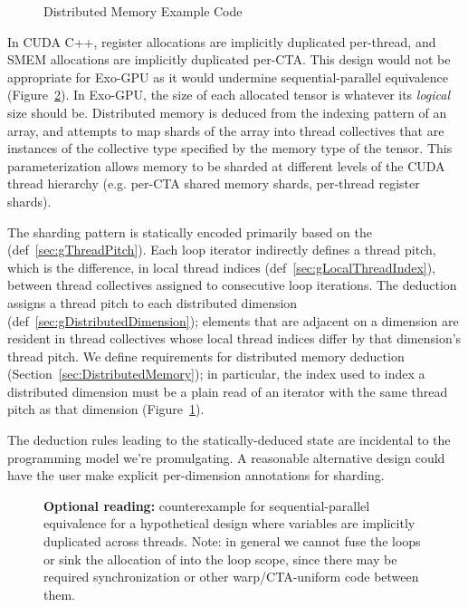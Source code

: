 
\begin{figure}[b!]
\codehrule

\caption{Distributed Memory Example Code}
\label{fig:OverviewDistributedMemory}
\codehrule
\end{figure}

In CUDA C++, register allocations are implicitly duplicated per-thread, and SMEM allocations are implicitly duplicated per-CTA.
This design would not be appropriate for Exo-GPU as it would undermine sequential-parallel equivalence (Figure~\ref{fig:why_dist}).
In Exo-GPU, the size of each allocated tensor is whatever its \emph{logical} size should be.
Distributed memory is deduced from the indexing pattern of an array, and attempts to map shards of the array into thread collectives that are instances of the collective type specified by the memory type of the tensor.
This parameterization allows memory to be sharded at different levels of the CUDA thread hierarchy (e.g. per-CTA shared memory shards, per-thread register shards).

The sharding pattern is statically encoded primarily based on the  (def~\ref{sec:gThreadPitch}).
Each  loop iterator indirectly defines a thread pitch, which is the difference, in local thread indices (def~\ref{sec:gLocalThreadIndex}), between thread collectives assigned to consecutive loop iterations.
The deduction assigns a thread pitch to each distributed dimension (def~\ref{sec:gDistributedDimension}); elements that are adjacent on a dimension are resident in thread collectives whose local thread indices differ by that dimension's thread pitch.
We define requirements for distributed memory deduction (Section~\ref{sec:DistributedMemory}); in particular, the index used to index a distributed dimension must be a plain read of an iterator with the same thread pitch as that dimension (Figure~\ref{fig:OverviewDistributedMemory}).

The deduction rules leading to the statically-deduced state are incidental to the programming model we're promulgating.
A reasonable alternative design could have the user make explicit per-dimension annotations for sharding.

\begin{figure}[!h]
\codehrule

\caption{\textbf{Optional reading:} counterexample for sequential-parallel equivalence for a hypothetical design where variables are implicitly duplicated across threads.
Note: in general we cannot fuse the  loops or sink the allocation of  into the loop scope, since there may be required synchronization or other warp/CTA-uniform code between them.}
\label{fig:why_dist}
\codehrule
\end{figure}

